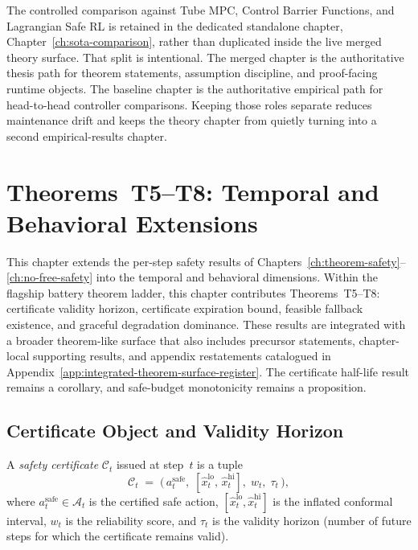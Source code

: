 The controlled comparison against Tube MPC, Control Barrier Functions, and
Lagrangian Safe RL is retained in the dedicated standalone chapter,
Chapter~\ref{ch:sota-comparison}, rather than duplicated inside the live
merged theory surface.  That split is intentional.  The merged chapter is the
authoritative thesis path for theorem statements, assumption discipline, and
proof-facing runtime objects.  The baseline chapter is the authoritative
empirical path for head-to-head controller comparisons.  Keeping those roles
separate reduces maintenance drift and keeps the theory chapter from quietly
turning into a second empirical-results chapter.




\section{Theorems~T5--T8: Temporal and Behavioral Extensions}
\label{ch:temporal-extensions}

This chapter extends the per-step safety results of
Chapters~\ref{ch:theorem-safety}--\ref{ch:no-free-safety} into the
temporal and behavioral dimensions.  Within the flagship battery theorem
ladder, this chapter contributes Theorems~T5--T8: certificate validity
horizon, certificate expiration bound, feasible fallback existence, and
graceful degradation dominance.  These results are integrated with a broader
theorem-like surface that also includes precursor statements, chapter-local
supporting results, and appendix restatements catalogued in
Appendix~\ref{app:integrated-theorem-surface-register}.  The certificate
half-life result remains a corollary, and safe-budget monotonicity remains a
proposition.


\subsection{Certificate Object and Validity Horizon}

\begin{definition}
\label{def:certificate}
A \emph{safety certificate} $\mathcal{C}_t$ issued at step~$t$ is a
tuple
\[
  \mathcal{C}_t \;=\;
  \bigl(\,a_t^{\text{safe}},\;
  [\hat{x}_t^{\text{lo}},\, \hat{x}_t^{\text{hi}}],\;
  w_t,\;
  \tau_t\,\bigr),
\]
where $a_t^{\text{safe}} \in \mathcal{A}_t$ is the certified safe action,
$[\hat{x}_t^{\text{lo}}, \hat{x}_t^{\text{hi}}]$ is the inflated
conformal interval, $w_t$ is the reliability score, and
$\tau_t$ is the validity horizon (number of future steps for which
the certificate remains valid).
\end{definition}

